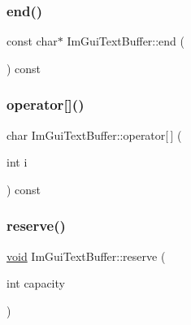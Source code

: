 \mbox{\label{structImGuiTextBuffer_a2fc30ad0d384f98dfcea722f798d91f2}} 
\subsubsection{\texorpdfstring{end()}{end()}}
{\footnotesize\ttfamily const char$\ast$ Im\+Gui\+Text\+Buffer\+::end (\begin{DoxyParamCaption}{ }\end{DoxyParamCaption}) const\hspace{0.3cm}{\ttfamily [inline]}}

\mbox{\label{structImGuiTextBuffer_a13748a5db12eb77d716d0347a552b310}} 
\subsubsection{\texorpdfstring{operator[]()}{operator[]()}}
{\footnotesize\ttfamily char Im\+Gui\+Text\+Buffer\+::operator\mbox{[}$\,$\mbox{]} (\begin{DoxyParamCaption}\item[{int}]{i }\end{DoxyParamCaption}) const\hspace{0.3cm}{\ttfamily [inline]}}

\mbox{\label{structImGuiTextBuffer_a3271f361e0f1997f4c3eb77665fdf161}} 
\subsubsection{\texorpdfstring{reserve()}{reserve()}}
{\footnotesize\ttfamily \hyperlink{imgui__impl__opengl3__loader_8h_ac668e7cffd9e2e9cfee428b9b2f34fa7}{void} Im\+Gui\+Text\+Buffer\+::reserve (\begin{DoxyParamCaption}\item[{int}]{capacity }\end{DoxyParamCaption})\hspace{0.3cm}{\ttfamily [inline]}}

